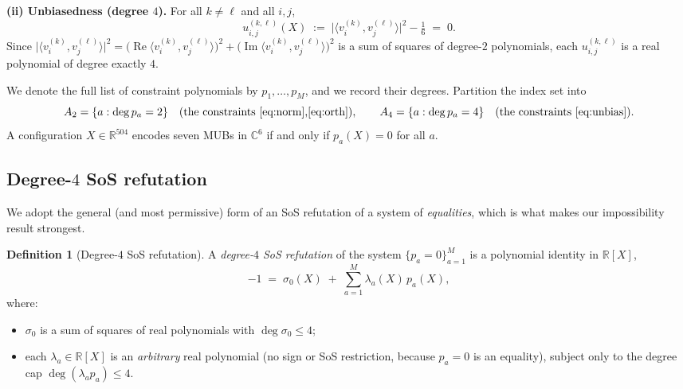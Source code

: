 \documentclass{amsart}
\theoremstyle{definition}
\newtheorem{definition}{Definition}
\begin{document}
\medskip
\noindent\textbf{(ii) Unbiasedness (degree $4$).} For all $k\ne\ell$ and all $i,j$,
\begin{equation}\label{eq:unbias}
u^{(k,\ell)}_{i,j}(X)\;:=\;\bigl|\langle v^{(k)}_i,v^{(\ell)}_j\rangle\bigr|^2-\tfrac16\;=\;0 .
\end{equation}
Since $\bigl|\langle v^{(k)}_i,v^{(\ell)}_j\rangle\bigr|^2
=\bigl(\operatorname{Re}\langle v^{(k)}_i,v^{(\ell)}_j\rangle\bigr)^2
+\bigl(\operatorname{Im}\langle v^{(k)}_i,v^{(\ell)}_j\rangle\bigr)^2$ is a sum of squares of
degree-$2$ polynomials, each $u^{(k,\ell)}_{i,j}$ is a real polynomial of degree exactly $4$.

We denote the full list of constraint polynomials by $p_1,\dots,p_M$, and we record their
degrees. Partition the index set into
\[
A_2=\{a:\deg p_a=2\}\quad(\text{the constraints \eqref{eq:norm},\eqref{eq:orth}}),
\qquad
A_4=\{a:\deg p_a=4\}\quad(\text{the constraints \eqref{eq:unbias}}).
\]
A configuration $X\in\mathbb{R}^{504}$ encodes seven MUBs in $\mathbb{C}^6$ if and only if
$p_a(X)=0$ for all $a$.

\subsection{Degree-$4$ SoS refutation}
We adopt the general (and most permissive) form of an SoS refutation of a system of
\emph{equalities}, which is what makes our impossibility result strongest.

\begin{definition}[Degree-$4$ SoS refutation]\label{def:refutation}
A \emph{degree-$4$ SoS refutation} of the system $\{p_a=0\}_{a=1}^M$ is a polynomial identity
in $\mathbb{R}[X]$,
\begin{equation}\label{eq:refutation}
-1\;=\;\sigma_0(X)\;+\;\sum_{a=1}^{M}\lambda_a(X)\,p_a(X),
\end{equation}
where:
\begin{itemize}
\item $\sigma_0$ is a sum of squares of real polynomials with $\deg\sigma_0\le 4$;
\item each $\lambda_a\in\mathbb{R}[X]$ is an \emph{arbitrary} real polynomial (no sign or SoS
restriction, because $p_a=0$ is an equality), subject only to the degree cap
$\deg(\lambda_a p_a)\le 4$.
\end{itemize}
\end{definition}
\end{document}
